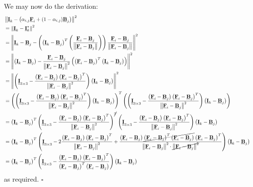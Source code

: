 \documentclass{article}
\theoremstyle{definition}
\def\vt#1{\underline{\mathbf{#1}}}
\def\mt#1{\underline{\underline{\mathbf{#1}}}}
\begin{document}
We may now do the derivation:
\begin{align*}
    &\left\| \vt I_k - \left( \alpha_{i,j}\vt F_i + (1-\alpha_{i,j})\vt B_j\right)  \right\|^2 \\
    &= \left\| \vt I_k -\vt I_k^*  \right\|^2\\
    &= \left\| \vt I_k - \vt B_j - \left( \left(\vt I_k - \vt B_j\right)^T \left( \frac{\vt F_i - \vt B_j}{\left\| \vt F_i - \vt B_j \right\|}\right) \right) \frac{\vt F_i - \vt B_j}{\left\| \vt F_i - \vt B_j \right\|}   \right\|^2 \\
    &= \left\| \left(\vt I_k - \vt B_j\right) - \frac{\vt F_i - \vt B_j}{\left\| \vt F_i - \vt B_j \right\|^2} \left( \left( \vt F_i - \vt B_j \right)^T \left(\vt I_k - \vt B_j\right)  \right)    \right\|^2 \\
    &= \left\| \left( \mt I_{3\times 3} - \frac{\left(\vt F_i - \vt B_j\right)\left( \vt F_i - \vt B_j \right)^T}{\left\| \vt F_i - \vt B_j \right\|^2}  \right)    \left(\vt I_k - \vt B_j\right)  \right\|^2 \\
    &= \left(\left( \mt I_{3\times 3} - \frac{\left(\vt F_i - \vt B_j\right)\left( \vt F_i - \vt B_j \right)^T}{\left\| \vt F_i - \vt B_j \right\|^2}  \right)    \left(\vt I_k - \vt B_j\right)\right)^T\left(\left( \mt I_{3\times 3} - \frac{\left(\vt F_i - \vt B_j\right)\left( \vt F_i - \vt B_j \right)^T}{\left\| \vt F_i - \vt B_j \right\|^2}  \right)    \left(\vt I_k - \vt B_j\right)\right) \\
    &= \left(\vt I_k - \vt B_j\right)^T \left( \mt I_{3\times 3} - \frac{\left(\vt F_i - \vt B_j\right)\left( \vt F_i - \vt B_j \right)^T}{\left\| \vt F_i - \vt B_j \right\|^2}  \right)^{\cancel{T}}     \left( \mt I_{3\times 3} - \frac{\left(\vt F_i - \vt B_j\right)\left( \vt F_i - \vt B_j \right)^T}{\left\| \vt F_i - \vt B_j \right\|^2}  \right)    \left(\vt I_k - \vt B_j\right) \\
    &= \left(\vt I_k - \vt B_j\right)^T \left( \mt I_{3\times 3} - 2\frac{\left(\vt F_i - \vt B_j\right)\left( \vt F_i - \vt B_j \right)^T}{\left\| \vt F_i - \vt B_j \right\|^2} + \frac{\left(\vt F_i - \vt B_j\right)\cancel{\left( \vt F_i - \vt B_j \right)^T \left(\vt F_i - \vt B_j\right)}\left( \vt F_i - \vt B_j \right)^T }{\left\| \vt F_i - \vt B_j \right\|^2 \cdot \cancel{\left\| \vt F_i - \vt B_j \right\|^2}}   \right)   \left(\vt I_k - \vt B_j\right) \\
    &= \left(\vt I_k - \vt B_j\right)^T \left( \mt I_{3\times 3} -  \frac{\left(\vt F_i - \vt B_j\right)\left( \vt F_i - \vt B_j \right)^T}{\left( \vt F_i - \vt B_j \right)^T\left( \vt F_i - \vt B_j \right)}   \right)   \left(\vt I_k - \vt B_j\right)
\end{align*}
as required. \hfill$\square$
\end{document}

